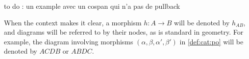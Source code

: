 \begin{definition} 
    to do : un example avec un cospan qui n'a pas de pullback
\end{definition}
\begin{notation}
    When the context makes it clear, a morphism \( h : A \to B \) will be denoted by \( h_{AB} \), and diagrams will be referred to by their nodes, as is standard in geometry. For example, the diagram involving morphisms \( ( \alpha, \beta, \alpha', \beta' ) \) in \autoref{def:cat:po} will be denoted by \( ACDB \) or \( ABDC \).
\end{notation}   

